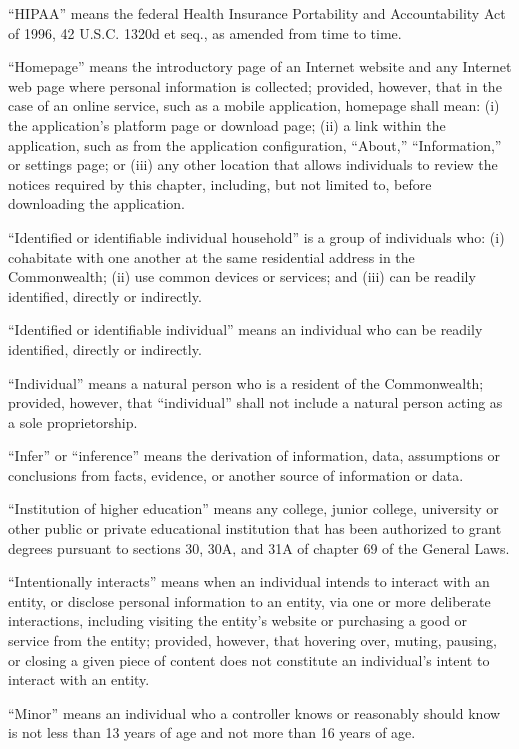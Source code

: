 “HIPAA” means the federal Health Insurance Portability and Accountability Act of 1996, 42 U.S.C. 1320d et seq., as amended from time to time.

“Homepage” means the introductory page of an Internet website and any Internet web page where personal information is collected; provided, however, that in the case of an online service, such as a mobile application, homepage shall mean: (i) the application’s platform page or download page; (ii) a link within the application, such as from the application configuration, “About,” “Information,” or settings page; or (iii) any other location that allows individuals to review the notices required by this chapter, including, but not limited to, before downloading the application.    

“Identified or identifiable individual household” is a group of individuals who: (i) cohabitate with one another at the same residential address in the Commonwealth; (ii) use common devices or services; and (iii) can be readily identified, directly or indirectly.

“Identified or identifiable individual” means an individual who can be readily identified, directly or indirectly.

“Individual” means a natural person who is a resident of the Commonwealth; provided, however, that “individual” shall not include a natural person acting as a sole proprietorship.

“Infer” or “inference” means the derivation of information, data, assumptions or conclusions from facts, evidence, or another source of information or data.

“Institution of higher education” means any college, junior college, university or other public or private educational institution that has been authorized to grant degrees pursuant to sections 30, 30A, and 31A of chapter 69 of the General Laws.

“Intentionally interacts” means when an individual intends to interact with an entity, or disclose personal information to an entity, via one or more deliberate interactions, including visiting the entity’s website or purchasing a good or service from the entity; provided, however, that hovering over, muting, pausing, or closing a given piece of content does not constitute an individual’s intent to interact with an entity.

“Minor” means an individual who a controller knows or reasonably should know is not less than 13 years of age and not more than 16 years of age.

